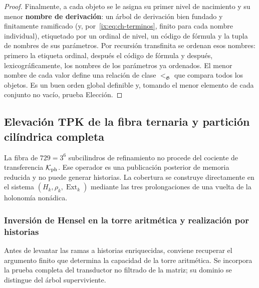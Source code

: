 \begin{proof}
Finalmente, a cada objeto se le asigna su primer nivel de nacimiento y su
menor \textbf{nombre de derivación}: un árbol de derivación bien fundado y
finitamente ramificado (y, por~\eqref{ix:eq:ch-terminos}, finito para cada nombre individual), etiquetado por un
ordinal de nivel, un código de fórmula y la tupla de nombres de sus parámetros.
Por recursión transfinita se ordenan esos nombres: primero la etiqueta ordinal,
después el código de fórmula y después, lexicográficamente, los nombres de los
parámetros ya ordenados. El menor nombre de cada valor define una relación de
clase \(<_{\mathfrak G}\) que compara todos los objetos. Es un buen orden
global definible y, tomando el menor elemento de cada conjunto no vacío,
prueba Elección.
\end{proof}


\subsection{Elevación TPK de la fibra ternaria y partición cilíndrica completa}
\label{ix:subsec:elevacion-catalogal-ch}

La fibra de \(729=3^6\) subcilindros de refinamiento no procede del cociente de transferencia
\(\mathcal K_{\rm ph}\). Ese operador es una publicación posterior de memoria
reducida y no puede generar historias. La cobertura se construye directamente
en el sistema \((H_k,\rho_k,\operatorname{Ext}_k)\) mediante las tres
prolongaciones de una vuelta de la holonomía nonádica.


\subsubsection{Inversión de Hensel en la torre aritmética y realización por historias}
\label{ix:sec:ch-capacidad-hensel}

Antes de levantar las ramas a historias enriquecidas, conviene recuperar el
argumento finito que determina la capacidad de la torre aritmética. Se
incorpora la prueba completa del transductor no filtrado de la matriz; su
dominio se distingue del árbol superviviente.

